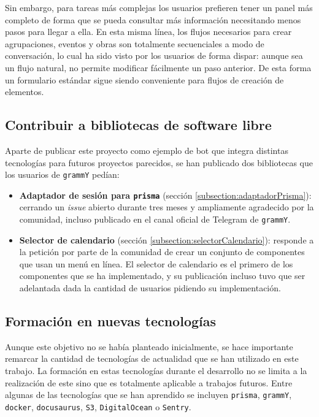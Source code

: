 Sin embargo, para tareas más complejas los usuarios prefieren tener un panel más completo de forma que se pueda consultar más información necesitando menos pasos para llegar a ella. En esta misma línea, los flujos necesarios para crear agrupaciones, eventos y obras son totalmente secuenciales a modo de conversación, lo cual ha sido visto por los usuarios de forma dispar: aunque sea un flujo natural, no permite modificar fácilmente un paso anterior. De esta forma un formulario estándar sigue siendo conveniente para flujos de creación de elementos.

\subsection{Contribuir a bibliotecas de software libre}

Aparte de publicar este proyecto como ejemplo de bot que integra distintas tecnologías para futuros proyectos parecidos, se han publicado dos bibliotecas que los usuarios de \texttt{grammY} pedían:

\begin{itemize}
    \item \textbf{Adaptador de sesión para \texttt{prisma}} (sección \ref{subsection:adaptadorPrisma}): cerrando un \textit{issue} abierto durante tres meses y ampliamente agradecido por la comunidad, incluso publicado en el canal oficial de Telegram de \texttt{grammY}.
    \item \textbf{Selector de calendario} (sección \ref{subsection:selectorCalendario}): responde a la petición por parte de la comunidad de crear un conjunto de componentes que usan un menú en línea. El selector de calendario es el primero de los componentes que se ha implementado, y su publicación incluso tuvo que ser adelantada dada la cantidad de usuarios pidiendo su implementación.
\end{itemize}


\subsection{Formación en nuevas tecnologías}

Aunque este objetivo no se había planteado inicialmente, se hace importante remarcar la cantidad de tecnologías de actualidad que se han utilizado en este trabajo. La formación en estas tecnologías durante el desarrollo no se limita a la realización de este sino que es totalmente aplicable a trabajos futuros. Entre algunas de las tecnologías que se han aprendido se incluyen \texttt{prisma}, \texttt{grammY}, \texttt{docker}, \texttt{docusaurus}, \texttt{S3}, \texttt{DigitalOcean} o \texttt{Sentry}.



